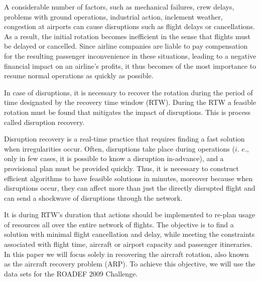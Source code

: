 \documentclass[ijoo,nonblindrev]{informs-ijoo}
\begin{document}
A considerable number of factors, such as mechanical failures, crew delays, problems with ground operations, industrial action, inclement weather, congestion at airports can cause disruptions such as flight delays or cancellations. As a result, the initial rotation becomes inefficient in the sense that flights must be delayed or cancelled. Since airline companies are liable to pay compensation for the resulting passenger inconvenience in these situations, leading to a negative financial impact on an airline’s profits, it thus becomes of the most importance to resume normal operations as quickly as possible. 



In case of disruptions, it is necessary to recover the rotation during the period of time designated by the recovery time window (RTW). During the RTW a feasible rotation must be found that mitigates the impact of disruptions. This is process called disruption recovery.

Disruption recovery is a real-time practice that requires finding a fast solution when irregularities occur. Often, disruptions take place during operations ($i.$ $e.$, only in few cases, it is possible to know a disruption in-advance), and a provisional plan must be provided quickly. Thus, it is necessary to construct efficient algorithms to have feasible solutions in minutes, moreover because when disruptions occur, they can affect more than just the directly disrupted flight and can send a shockwave of disruptions through the network.

It is during RTW’s duration that actions should be implemented to re-plan usage of resources all over the entire network of flights. The objective is to find a solution with minimal flight cancellation and delay, while meeting the constraints associated with flight time, aircraft or airport capacity and passenger itineraries. In this paper we will focus solely in recovering the aircraft rotation, also known as the aircraft recovery problem (ARP). To achieve this objective, we will use the data sets for the ROADEF 2009 Challenge. 
\begin{comment}
Every two years the \textit{French society of Operational Research and Decision Making} releases the ROADEF Challenge, which consists on a competition to solve a complex optimization problem that occurs in industry. In the ROADEF 2009 Challenge there is a step-wise simplification of a model, for disruption management in commercial aviation that aims at finding recovery planning of flights, aircraft assignments and passengers (including flight leg cancellation) on a given maximal horizon, so that a sum of penalties corresponding to various costs or discomforts is minimized. The present work is based on ROADEF 2009 Challengee and intends to develop a series of methodologies that will result in the generation of recovery processes for the disruptions induced by flight delays or cancellations, aircraft availability shortage or airport capacity decrease.\\

After retrieving the results for the ARRP using our algorithm, we will validate it using a flight schedule based on citep francis2020
\end{comment}
\end{document}
